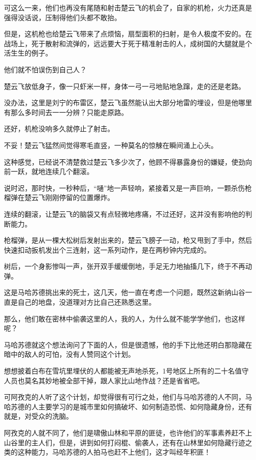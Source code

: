 可这么一来，他们也再没有尾随和射击楚云飞的机会了，自家的机枪，火力还真是强得没话说，压制得他们头都不敢抬。

但是，这机枪也给楚云飞带来了点烦恼，扇型面积的扫射，是令人极度不安的。在战场上，死于散射和流弹的，远远要大于死于精准射击的人，成树国的大腿就是个活生生的例子。

他们就不怕误伤到自己人？

楚云飞放低身子，像一只虾米一样，身体一弓一弓地贴地急蹿，走的还是老路。

没办法，这里是刘宁的布雷区，楚云飞虽然能认出大部分地雷的埋设，但是他哪里有那么多时间去一一分辨？只能走原路。

还好，机枪没响多久就停止了射击。

不妥！楚云飞猛然间觉得寒毛直竖，一种莫名的惊觫在瞬间涌上心头。

这种感觉，已经说不清楚救过楚云飞多少次了，他顾不得暴露身份的嫌疑，使劲向前一跃，就地连续几个翻滚。

说时迟，那时快，一秒种后，“嗵”地一声轻响，紧接着又是一声巨响，一颗杀伤枪榴弹在楚云飞刚刚停留的位置爆炸。

连续的翻滚，让楚云飞的脑袋又有点轻微地疼痛，不过还好，这并没有影响他的判断能力。

枪榴弹，是从一棵大松树后发射出来的，楚云飞膀子一动，枪又甩到了手中，然后快速扣动扳机发出个三连射，这一系列动作，是在两秒钟内完成的。

树后，一个身影惨叫一声，张开双手缓缓倒地，手足无力地抽搐几下，终于不再动弹。

这是马哈苏德挑出来的死士，这几天，他一直在考虑一个问题，既然这新纳山谷一直是自己的地盘，没道理对方比自己还熟悉这里。

那么，他们敢在密林中偷袭这里的人，我的人，为什么就不能学学他们，也这样呢？

马哈苏德就这个想法询问了下面的人，但是很遗憾，他的手下比他还明白那隐藏在暗中的敌人的可怕，没有人赞同这个计划。

想想披着白布在雪坑里埋伏的人都能被无声地杀死，1号地区上所有的二十名值守人员也莫名其妙地被全部干掉，跟人家比山地作战？还是省省吧。

可阿孜克的人听了这个计划，却觉得很有可行之处，他们与马哈苏德的人不同，马哈苏德的人主要学习的是城市里如何搞破坏、如何制造恐慌、如何隐藏身份，还有就是，对受众的洗脑。

阿孜克的人就不同了，他们是啸傲山林和平原的匪徒，也许他们的军事素养赶不上山谷里的主人们，但是，讲到如何打闷棍、偷袭人，还有在山林里如何隐藏行迹之类的这种能力，马哈苏德的人拍马也赶不上他们，这才叫经年积匪！

